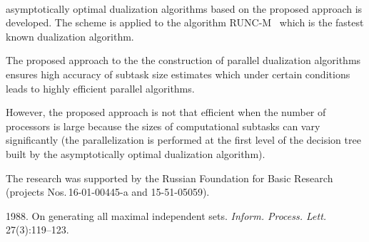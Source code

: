 \begin{figure*} %
    \vspace*{1pt}
\begin{center}
\mbox{%
\epsfxsize=120.707mm
}
\end{center}
\vspace*{-6pt}
    \label{fig:s_scheme3}
    \vspace*{14pt}
\end{figure*}

\begin{multicols}{2}

\noindent
 asymptotically
optimal dualization algorithms based on
 the proposed approach is
developed.
The scheme is applied to the algorithm RUNC-M~\cite{DP2015} which
is the fastest known dualization algorithm.

The proposed approach to the the construction of parallel
dualization algorithms ensures high accuracy of subtask size
estimates which under certain conditions leads to highly
efficient parallel algorithms.

However, the proposed approach is not that efficient when the
number of processors is large because the sizes of computational
subtasks can vary significantly (the parallelization is performed
at the first level of the decision tree built by the
asymptotically optimal dualization algorithm).



\Ack  



\noindent
The research was supported by the Russian Foundation for Basic 
Research (projects Nos.\,16-01-00445-a and 15-51-05059).


\renewcommand{\bibname}{\protect\rmfamily References}



{\small\frenchspacing
{\baselineskip=10.65pt
\begin{thebibliography}{99}
    
1988.
On generating all maximal independent sets.
\textit{Inform. Process. Lett.} 27(3):119--123.
    

\end{thebibliography}}}
\end{multicols}
